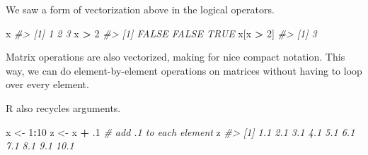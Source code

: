 \documentclass[]{book}
\newenvironment{Shaded}{\begin{snugshade}}{\end{snugshade}}
\newcommand{\KeywordTok}[1]{\textcolor[rgb]{0.13,0.29,0.53}{\textbf{#1}}}
\newcommand{\DecValTok}[1]{\textcolor[rgb]{0.00,0.00,0.81}{#1}}
\newcommand{\StringTok}[1]{\textcolor[rgb]{0.31,0.60,0.02}{#1}}
\newcommand{\CommentTok}[1]{\textcolor[rgb]{0.56,0.35,0.01}{\textit{#1}}}
\newcommand{\OperatorTok}[1]{\textcolor[rgb]{0.81,0.36,0.00}{\textbf{#1}}}
\newcommand{\NormalTok}[1]{#1}
\begin{document}
We saw a form of vectorization above in the logical operators.

\begin{Shaded}
\begin{Highlighting}[]
\NormalTok{x}
\CommentTok{#> [1] 1 2 3}
\NormalTok{x }\OperatorTok{>}\StringTok{ }\DecValTok{2}
\CommentTok{#> [1] FALSE FALSE  TRUE}
\NormalTok{x[x }\OperatorTok{>}\StringTok{ }\DecValTok{2}\NormalTok{]}
\CommentTok{#> [1] 3}
\end{Highlighting}
\end{Shaded}

Matrix operations are also vectorized, making for nice compact notation.
This way, we can do element-by-element operations on matrices without
having to loop over every element.

\begin{Shaded}
\end{Shaded}

R also recycles arguments.

\begin{Shaded}
\begin{Highlighting}[]
\NormalTok{x <-}\StringTok{ }\DecValTok{1}\OperatorTok{:}\DecValTok{10}
\NormalTok{z <-}\StringTok{ }\NormalTok{x }\OperatorTok{+}\StringTok{ }\NormalTok{.}\DecValTok{1}  \CommentTok{# add .1 to each element}
\NormalTok{z}
\CommentTok{#>  [1]  1.1  2.1  3.1  4.1  5.1  6.1  7.1  8.1  9.1 10.1}
\end{Highlighting}
\end{Shaded}
\end{document}
